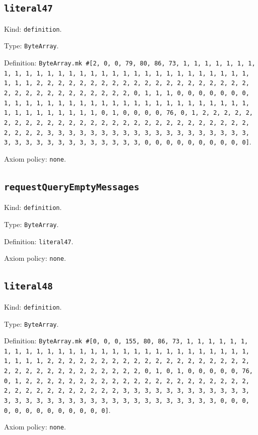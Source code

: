\documentclass[11pt]{article}
\begin{document}
\subsection*{\texttt{literal47}}
\noindent Kind: \texttt{definition}.\par
\noindent Type: \texttt{ByteArray}.\par
\noindent Definition: \texttt{ByteArray.mk \#[2, 0, 0, 79, 80, 86, 73, 1, 1, 1, 1, 1, 1, 1, 1, 1, 1, 1, 1, 1, 1, 1, 1, 1, 1, 1, 1, 1, 1, 1, 1, 1, 1, 1, 1, 1, 1, 1, 1, 1, 2, 2, 2, 2, 2, 2, 2, 2, 2, 2, 2, 2, 2, 2, 2, 2, 2, 2, 2, 2, 2, 2, 2, 2, 2, 2, 2, 2, 2, 2, 2, 2, 0, 1, 1, 1, 0, 0, 0, 0, 0, 0, 0, 1, 1, 1, 1, 1, 1, 1, 1, 1, 1, 1, 1, 1, 1, 1, 1, 1, 1, 1, 1, 1, 1, 1, 1, 1, 1, 1, 1, 1, 1, 1, 1, 0, 1, 0, 0, 0, 0, 76, 0, 1, 2, 2, 2, 2, 2, 2, 2, 2, 2, 2, 2, 2, 2, 2, 2, 2, 2, 2, 2, 2, 2, 2, 2, 2, 2, 2, 2, 2, 2, 2, 2, 2, 3, 3, 3, 3, 3, 3, 3, 3, 3, 3, 3, 3, 3, 3, 3, 3, 3, 3, 3, 3, 3, 3, 3, 3, 3, 3, 3, 3, 3, 3, 3, 3, 0, 0, 0, 0, 0, 0, 0, 0, 0, 0]}.\par
\noindent Axiom policy: \texttt{none}.\par
\subsection*{\texttt{requestQueryEmptyMessages}}
\noindent Kind: \texttt{definition}.\par
\noindent Type: \texttt{ByteArray}.\par
\noindent Definition: \texttt{literal47}.\par
\noindent Axiom policy: \texttt{none}.\par
\subsection*{\texttt{literal48}}
\noindent Kind: \texttt{definition}.\par
\noindent Type: \texttt{ByteArray}.\par
\noindent Definition: \texttt{ByteArray.mk \#[0, 0, 0, 155, 80, 86, 73, 1, 1, 1, 1, 1, 1, 1, 1, 1, 1, 1, 1, 1, 1, 1, 1, 1, 1, 1, 1, 1, 1, 1, 1, 1, 1, 1, 1, 1, 1, 1, 1, 1, 2, 2, 2, 2, 2, 2, 2, 2, 2, 2, 2, 2, 2, 2, 2, 2, 2, 2, 2, 2, 2, 2, 2, 2, 2, 2, 2, 2, 2, 2, 2, 2, 0, 1, 0, 1, 0, 0, 0, 0, 0, 76, 0, 1, 2, 2, 2, 2, 2, 2, 2, 2, 2, 2, 2, 2, 2, 2, 2, 2, 2, 2, 2, 2, 2, 2, 2, 2, 2, 2, 2, 2, 2, 2, 2, 2, 3, 3, 3, 3, 3, 3, 3, 3, 3, 3, 3, 3, 3, 3, 3, 3, 3, 3, 3, 3, 3, 3, 3, 3, 3, 3, 3, 3, 3, 3, 3, 3, 0, 0, 0, 0, 0, 0, 0, 0, 0, 0, 0, 0, 0]}.\par
\noindent Axiom policy: \texttt{none}.\par
\end{document}
